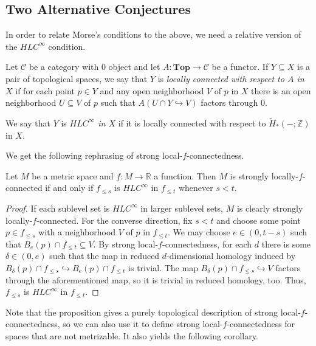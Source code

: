 
\subsection{Two Alternative Conjectures}
In order to relate Morse's conditions to the above, we need a relative version of the $HLC^{\infty}$ condition.

\begin{defi}\label{defi:hlc}
Let $\mathcal{C}$ be a category with $0$ object and let $A\colon\mathbf{Top}\to\mathcal{C}$ be a functor. If $Y\subseteq X$ is a pair of topological spaces, we say that $Y$ is \emph{locally connected with respect to $A$ in $X$} if for each point $p\in Y$ and any open neighborhood $V$ of $p$ in $X$ there is an open neighborhood $U\subseteq V$ of $p$ such that $A(U\cap Y\hookrightarrow V)$ factors through 0.

We say that $Y$ is \emph{$HLC^{\infty}$ in $X$} if it is locally connected with respect to $\tilde{H}_*(-;\mathbb{Z})$ in $X$.
\end{defi}

We get the following rephrasing of strong local-$f$-connectedness.

\begin{prop}
Let $M$ be a metric space and $f\colon M\to\mathbb{R}$ a function. Then $M$ is strongly locally-$f$-connected if and only if $f_{\leq s}$ is $HLC^{\infty}$ in $f_{\leq t}$ whenever $s<t$.
\end{prop}
\begin{proof}
If each sublevel set is $HLC^{\infty}$ in larger sublevel sets, $M$ is clearly strongly locally-$f$-connected. For the converse direction, fix $s<t$ and choose some point $p\in f_{\leq s}$ with a neighborhood $V$ of $p$ in $f_{\leq t}$. We may choose $e\in(0, t-s)$ such that $B_e(p)\cap f_{\leq t}\subseteq V$. By strong local-$f$-connectedness, for each $d$ there is some $\delta\in(0,e)$ such that the map in reduced $d$-dimensional homology induced by $B_{\delta}(p)\cap f_{\leq s}\hookrightarrow B_e(p)\cap f_{\leq t}$ is trivial. The map $B_{\delta}(p)\cap f_{\leq s}\hookrightarrow V$ factors through the aforementioned map, so it is trivial in reduced homology, too. Thus, $f_{\leq s}$ is $HLC^{\infty}$ in $f_{\leq t}$.
\end{proof}

Note that the proposition gives a purely topological description of strong local-$f$-connectedness, so we can also use it to define strong local-$f$-connectedness for spaces that are not metrizable. It also yields the following corollary.

